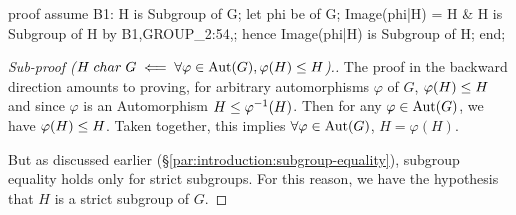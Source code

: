 \nwenddocs{}\endmoddef\nwstartdeflinemarkup{}\nwenddeflinemarkup
proof
  assume B1: H is  Subgroup of G;
  let phi be  of G;
  Image(phi|H) = H & H is Subgroup of H by B1,GROUP_2:54,;
  hence Image(phi|H) is Subgroup of H;
end;
\nwendcode{}\nwdocspar

\begin{proof}[Sub-proof ($H\mathrel{char} G\impliedby\forall\varphi\in\operatorname{Aut}(G),\varphi(H)\leq H$).]
The proof in the backward direction amounts to proving, for arbitrary
automorphisms $\varphi$ of $G$, $\varphi(H)\leq H$ and since
$\varphi$ is an Automorphism $H\leq \varphi^{-1}(H)$. Then for any
$\varphi\in\operatorname{Aut}(G)$, we have $\varphi(H)\leq H$. Taken together,
this implies $\forall\varphi\in\operatorname{Aut}(G)$, $H = \varphi(H)$.

But as discussed earlier (\S\ref{par:introduction:subgroup-equality}),
subgroup equality holds only for strict subgroups. For this reason, we
have the hypothesis that $H$ is a strict subgroup of $G$.
\end{proof}

